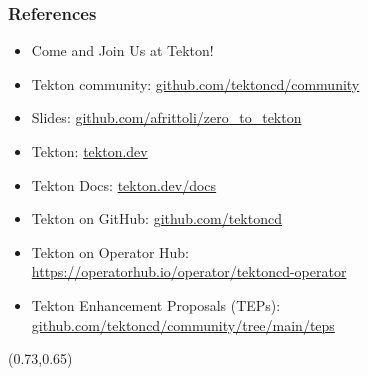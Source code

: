 \documentclass[aspectratio=169,11pt,hyperref={colorlinks=true}]{beamer}
\begin{document}
\begin{blackframe}
  \frametitle{References}
  \begin{itemize}
    \item \large Come and Join Us at Tekton!
    \item \normalsize Tekton community: \href{https://github.com/tektoncd/community}{github.com/tektoncd/community} \\
  \end{itemize}
  \begin{itemize}
    \item Slides: \href{https://github.com/afrittoli/zero_to_tekton/blob/cnd2021/zero_to_tekton.pdf}{github.com/afrittoli/zero\_to\_tekton}
    \item Tekton: \href{https://tekton.dev}{tekton.dev}
    \item Tekton Docs: \href{https://tekton.dev/docs}{tekton.dev/docs}
    \item Tekton on GitHub: \href{https://github.com/tektoncd}{github.com/tektoncd}
    \item Tekton on Operator Hub:\\\href{https://https://operatorhub.io/operator/tektoncd-operator}{https://operatorhub.io/operator/tektoncd-operator}
    \item Tekton Enhancement Proposals (TEPs): \href{https://github.com/tektoncd/community/tree/main/teps\#tekton-enhancement-proposals-teps}{github.com/tektoncd/community/tree/main/teps}
  \end{itemize}
  \begin{textblock*}{0.13\paperwidth}(0.73\paperwidth,0.65\paperheight)
    
  \end{textblock*}
\end{blackframe}
\end{document}
